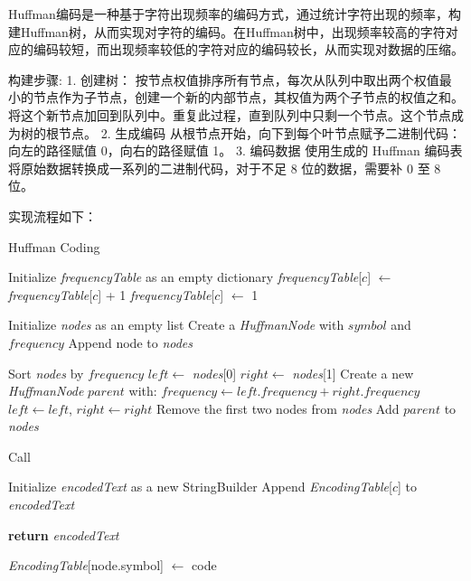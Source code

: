 \documentclass{article}
\begin{document}
Huffman编码是一种基于字符出现频率的编码方式，通过统计字符出现的频率，构建Huffman树，从而实现对字符的编码。在Huffman树中，出现频率较高的字符对应的编码较短，而出现频率较低的字符对应的编码较长，从而实现对数据的压缩。

构建步骤:
1. 创建树：
按节点权值排序所有节点，每次从队列中取出两个权值最小的节点作为子节点，创建一个新的内部节点，其权值为两个子节点的权值之和。
将这个新节点加回到队列中。重复此过程，直到队列中只剩一个节点。这个节点成为树的根节点。
2. 生成编码
从根节点开始，向下到每个叶节点赋予二进制代码：向左的路径赋值 0，向右的路径赋值 1。
3. 编码数据
使用生成的 Huffman 编码表将原始数据转换成一系列的二进制代码，对于不足 8 位的数据，需要补 0 至 8 位。

实现流程如下：
\FloatBarrier
\begin{algorithm}
\caption{Huffman Coding}
\begin{algorithmic}[1]
    \State Initialize \textit{frequencyTable} as an empty dictionary
            \State \textit{frequencyTable}[$c$] $\gets$ \textit{frequencyTable}[$c$] + 1
        \Else
            \State \textit{frequencyTable}[$c$] $\gets$ 1
        \EndIf
    \EndFor
    
    \State Initialize \textit{nodes} as an empty list
        \State Create a \textit{HuffmanNode} with $symbol$ and $frequency$
        \State Append node to \textit{nodes}
    \EndFor
    
        \State Sort \textit{nodes} by $frequency$
        \State $left \gets$ \textit{nodes}[0]
        \State $right \gets$ \textit{nodes}[1]
        \State Create a new \textit{HuffmanNode} $parent$ with:
            \State \quad $frequency \gets left.frequency + right.frequency$
            \State \quad $left \gets left$, $right \gets right$
        \State Remove the first two nodes from \textit{nodes}
        \State Add $parent$ to \textit{nodes}
    \EndWhile

    \State Call 
    
    \State Initialize \textit{encodedText} as a new StringBuilder
        \State Append \textit{EncodingTable}[$c$] to \textit{encodedText}
    \EndFor

    \State \textbf{return} \textit{encodedText}
\EndProcedure

        \State \textit{EncodingTable}[node.symbol] $\gets$ code
    \Else
        \State {}
        \State {}
    \EndIf
\EndProcedure

\end{algorithmic}
\end{algorithm}
\FloatBarrier
\end{document}

